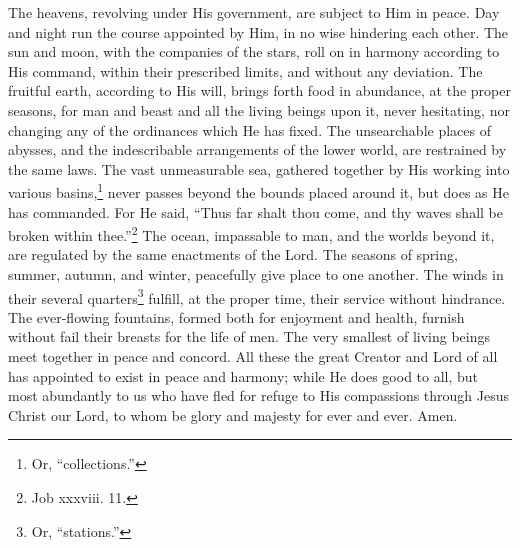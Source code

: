
The heavens, revolving under His government, are subject to Him in peace. Day and night run the course appointed by Him, in no wise hindering each other. The sun and moon, with the companies of the stars, roll on in harmony according to His command, within their prescribed limits, and without any deviation. The fruitful earth, according to His will, brings forth food in abundance, at the proper seasons, for man and beast and all the living beings upon it, never hesitating, nor changing any of the ordinances which He has fixed. The unsearchable places of abysses, and the indescribable arrangements of the lower world, are restrained by the same laws. The vast unmeasurable sea, gathered together by His working into various basins,\footnote{Or, “collections.”} never passes beyond the bounds placed around it, but does as He has commanded. For He said, “Thus far shalt thou come, and thy waves shall be broken within thee.”\footnote{Job xxxviii. 11.} The ocean, impassable to man, and the worlds beyond it, are regulated by the same enactments of the Lord. The seasons of spring, summer, autumn, and winter, peacefully give place to one another. The winds in their several quarters\footnote{Or, “stations.”} fulfill, at the proper time, their service without hindrance. The ever-flowing fountains, formed both for enjoyment and health, furnish without fail their breasts for the life of men. The very smallest  of living beings meet together in peace and concord. All these the great Creator and Lord of all has appointed to exist in peace and harmony; while He does good to all, but most abundantly to us who have fled for refuge to His compassions through Jesus Christ our Lord, to whom be glory and majesty for ever and ever. Amen.


